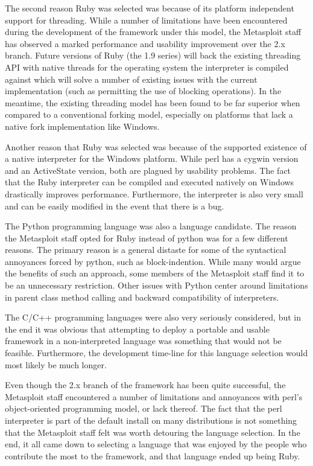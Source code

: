 \documentclass{report}
\begin{document}
\par
The second reason Ruby was selected was because of its platform
independent support for threading.  While a number of limitations
have been encountered during the development of the framework under
this model, the Metasploit staff has observed a marked performance
and usability improvement over the 2.x branch.  Future versions of
Ruby (the 1.9 series) will back the existing threading API with
native threads for the operating system the interpreter is compiled
against which will solve a number of existing issues with the
current implementation (such as permitting the use of blocking
operations).  In the meantime, the existing threading model has been
found to be far superior when compared to a conventional forking
model, especially on platforms that lack a native fork
implementation like Windows.

\par
Another reason that Ruby was selected was because of the supported
existence of a native interpreter for the Windows platform.  While
perl has a cygwin version and an ActiveState version, both are
plagued by usability problems.  The fact that the Ruby interpreter
can be compiled and executed natively on Windows drastically
improves performance.  Furthermore, the interpreter is also very
small and can be easily modified in the event that there is a bug.

\par
The Python programming language was also a language candidate. The
reason the Metasploit staff opted for Ruby instead of python was for
a few different reasons.  The primary reason is a general distaste
for some of the syntactical annoyances forced by python, such as
block-indention.  While many would argue the benefits of such an
approach, some members of the Metasploit staff find it to be an
unnecessary restriction.  Other issues with Python center around
limitations in parent class method calling and backward
compatibility of interpreters.

\par
The C/C++ programming languages were also very seriously considered,
but in the end it was obvious that attempting to deploy a portable
and usable framework in a non-interpreted language was something
that would not be feasible.  Furthermore, the development time-line
for this language selection would most likely be much longer.

\par
Even though the 2.x branch of the framework has been quite
successful, the Metasploit staff encountered a number of limitations
and annoyances with perl's object-oriented programming model, or
lack thereof.  The fact that the perl interpreter is part of the
default install on many distributions is not something that the
Metasploit staff felt was worth detouring the language selection. In
the end, it all came down to selecting a language that was enjoyed
by the people who contribute the most to the framework, and that
language ended up being Ruby.
\end{document}
